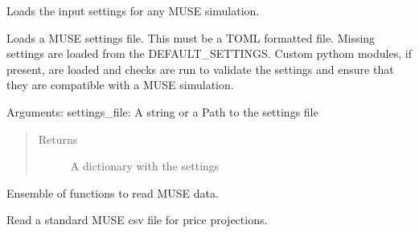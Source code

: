 \documentclass[letterpaper,10pt,english]{sphinxmanual}
\begin{document}
\begin{fulllineitems}
\label{\detokenize{api:muse.readers.toml.read_settings}}
Loads the input settings for any MUSE simulation.

Loads a MUSE settings file. This must be a TOML formatted file. Missing settings are
loaded from the DEFAULT\_SETTINGS. Custom pythom modules, if present, are loaded
and checks are run to validate the settings and ensure that they are compatible with
a MUSE simulation.

Arguments:
settings\_file: A string or a Path to the settings file
\begin{quote}\begin{description}
\item[{Returns}] \leavevmode
A dictionary with the settings

\end{description}\end{quote}

\end{fulllineitems}

\label{\detokenize{api:module-muse.readers.csv}}
Ensemble of functions to read MUSE data.

\begin{fulllineitems}
\label{\detokenize{api:muse.readers.csv.read_attribute_table}}
Read a standard MUSE csv file for price projections.

\end{fulllineitems}
\end{document}
